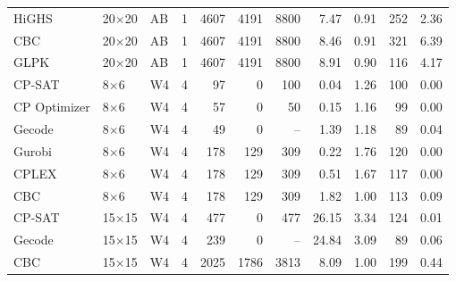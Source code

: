 \begin{tabular}{lllrrrrrrrr}
HiGHS & 20$\times$20 & AB & 1 & 4607 & 4191 & 8800 & 7.47 & 0.91 & 252 & 2.36 \\
CBC & 20$\times$20 & AB & 1 & 4607 & 4191 & 8800 & 8.46 & 0.91 & 321 & 6.39 \\
GLPK & 20$\times$20 & AB & 1 & 4607 & 4191 & 8800 & 8.91 & 0.90 & 116 & 4.17 \\
\midrule
CP-SAT & 8$\times$6 & W4 & 4 & 97 & 0 & 100 & 0.04 & 1.26 & 100 & 0.00 \\
CP Optimizer & 8$\times$6 & W4 & 4 & 57 & 0 & 50 & 0.15 & 1.16 & 99 & 0.00 \\
Gecode & 8$\times$6 & W4 & 4 & 49 & 0 & -- & 1.39 & 1.18 & 89 & 0.04 \\
Gurobi & 8$\times$6 & W4 & 4 & 178 & 129 & 309 & 0.22 & 1.76 & 120 & 0.00 \\
CPLEX & 8$\times$6 & W4 & 4 & 178 & 129 & 309 & 0.51 & 1.67 & 117 & 0.00 \\
CBC & 8$\times$6 & W4 & 4 & 178 & 129 & 309 & 1.82 & 1.00 & 113 & 0.09 \\
CP-SAT & 15$\times$15 & W4 & 4 & 477 & 0 & 477 & 26.15 & 3.34 & 124 & 0.01 \\
Gecode & 15$\times$15 & W4 & 4 & 239 & 0 & -- & 24.84 & 3.09 & 89 & 0.06 \\
CBC & 15$\times$15 & W4 & 4 & 2025 & 1786 & 3813 & 8.09 & 1.00 & 199 & 0.44 \\
\bottomrule
\end{tabular}
